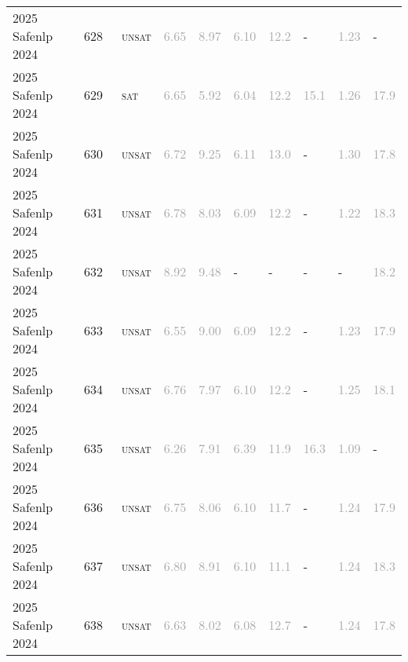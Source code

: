 \begin{center}
{\begin{longtable}{@{}llllllllll@{}}
2025 Safenlp 2024 & 628 & ~\textsc{unsat} & \textcolor{darkgray}{6.65} & \textcolor{darkgray}{8.97} & \textcolor{darkgray}{6.10} & \textcolor{darkgray}{12.2} & - & \textcolor{darkgray}{1.23} & - \\
2025 Safenlp 2024 & 629 & ~\textsc{sat} & \textcolor{darkgray}{6.65} & \textcolor{darkgray}{5.92} & \textcolor{darkgray}{6.04} & \textcolor{darkgray}{12.2} & \textcolor{darkgray}{15.1} & \textcolor{darkgray}{1.26} & \textcolor{darkgray}{17.9} \\
2025 Safenlp 2024 & 630 & ~\textsc{unsat} & \textcolor{darkgray}{6.72} & \textcolor{darkgray}{9.25} & \textcolor{darkgray}{6.11} & \textcolor{darkgray}{13.0} & - & \textcolor{darkgray}{1.30} & \textcolor{darkgray}{17.8} \\
2025 Safenlp 2024 & 631 & ~\textsc{unsat} & \textcolor{darkgray}{6.78} & \textcolor{darkgray}{8.03} & \textcolor{darkgray}{6.09} & \textcolor{darkgray}{12.2} & - & \textcolor{darkgray}{1.22} & \textcolor{darkgray}{18.3} \\
2025 Safenlp 2024 & 632 & ~\textsc{unsat} & \textcolor{darkgray}{8.92} & \textcolor{darkgray}{9.48} & - & - & - & - & \textcolor{darkgray}{18.2} \\
2025 Safenlp 2024 & 633 & ~\textsc{unsat} & \textcolor{darkgray}{6.55} & \textcolor{darkgray}{9.00} & \textcolor{darkgray}{6.09} & \textcolor{darkgray}{12.2} & - & \textcolor{darkgray}{1.23} & \textcolor{darkgray}{17.9} \\
2025 Safenlp 2024 & 634 & ~\textsc{unsat} & \textcolor{darkgray}{6.76} & \textcolor{darkgray}{7.97} & \textcolor{darkgray}{6.10} & \textcolor{darkgray}{12.2} & - & \textcolor{darkgray}{1.25} & \textcolor{darkgray}{18.1} \\
2025 Safenlp 2024 & 635 & ~\textsc{unsat} & \textcolor{darkgray}{6.26} & \textcolor{darkgray}{7.91} & \textcolor{darkgray}{6.39} & \textcolor{darkgray}{11.9} & \textcolor{darkgray}{16.3} & \textcolor{darkgray}{1.09} & - \\
2025 Safenlp 2024 & 636 & ~\textsc{unsat} & \textcolor{darkgray}{6.75} & \textcolor{darkgray}{8.06} & \textcolor{darkgray}{6.10} & \textcolor{darkgray}{11.7} & - & \textcolor{darkgray}{1.24} & \textcolor{darkgray}{17.9} \\
2025 Safenlp 2024 & 637 & ~\textsc{unsat} & \textcolor{darkgray}{6.80} & \textcolor{darkgray}{8.91} & \textcolor{darkgray}{6.10} & \textcolor{darkgray}{11.1} & - & \textcolor{darkgray}{1.24} & \textcolor{darkgray}{18.3} \\
2025 Safenlp 2024 & 638 & ~\textsc{unsat} & \textcolor{darkgray}{6.63} & \textcolor{darkgray}{8.02} & \textcolor{darkgray}{6.08} & \textcolor{darkgray}{12.7} & - & \textcolor{darkgray}{1.24} & \textcolor{darkgray}{17.8} \\

\end{longtable}}
\end{center}
